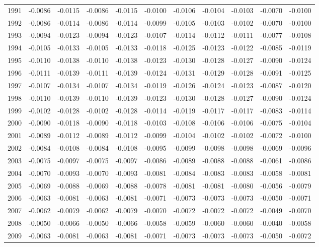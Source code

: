 \begin{tabular}{ccccccccccc}
  1991 & -0.0086 & -0.0115 & -0.0086 & -0.0115 & -0.0100 & -0.0106 & -0.0104 & -0.0103 & -0.0070 & -0.0100 \\ 
  1992 & -0.0086 & -0.0114 & -0.0086 & -0.0114 & -0.0099 & -0.0105 & -0.0103 & -0.0102 & -0.0070 & -0.0100 \\ 
  1993 & -0.0094 & -0.0123 & -0.0094 & -0.0123 & -0.0107 & -0.0114 & -0.0112 & -0.0111 & -0.0077 & -0.0108 \\ 
  1994 & -0.0105 & -0.0133 & -0.0105 & -0.0133 & -0.0118 & -0.0125 & -0.0123 & -0.0122 & -0.0085 & -0.0119 \\ 
  1995 & -0.0110 & -0.0138 & -0.0110 & -0.0138 & -0.0123 & -0.0130 & -0.0128 & -0.0127 & -0.0090 & -0.0124 \\ 
  1996 & -0.0111 & -0.0139 & -0.0111 & -0.0139 & -0.0124 & -0.0131 & -0.0129 & -0.0128 & -0.0091 & -0.0125 \\ 
  1997 & -0.0107 & -0.0134 & -0.0107 & -0.0134 & -0.0119 & -0.0126 & -0.0124 & -0.0123 & -0.0087 & -0.0120 \\ 
  1998 & -0.0110 & -0.0139 & -0.0110 & -0.0139 & -0.0123 & -0.0130 & -0.0128 & -0.0127 & -0.0090 & -0.0124 \\ 
  1999 & -0.0102 & -0.0128 & -0.0102 & -0.0128 & -0.0114 & -0.0119 & -0.0117 & -0.0117 & -0.0083 & -0.0114 \\ 
  2000 & -0.0090 & -0.0118 & -0.0090 & -0.0118 & -0.0103 & -0.0108 & -0.0106 & -0.0106 & -0.0075 & -0.0104 \\ 
  2001 & -0.0089 & -0.0112 & -0.0089 & -0.0112 & -0.0099 & -0.0104 & -0.0102 & -0.0102 & -0.0072 & -0.0100 \\ 
  2002 & -0.0084 & -0.0108 & -0.0084 & -0.0108 & -0.0095 & -0.0099 & -0.0098 & -0.0098 & -0.0069 & -0.0096 \\ 
  2003 & -0.0075 & -0.0097 & -0.0075 & -0.0097 & -0.0086 & -0.0089 & -0.0088 & -0.0088 & -0.0061 & -0.0086 \\ 
  2004 & -0.0070 & -0.0093 & -0.0070 & -0.0093 & -0.0081 & -0.0084 & -0.0083 & -0.0083 & -0.0058 & -0.0081 \\ 
  2005 & -0.0069 & -0.0088 & -0.0069 & -0.0088 & -0.0078 & -0.0081 & -0.0081 & -0.0080 & -0.0056 & -0.0079 \\ 
  2006 & -0.0063 & -0.0081 & -0.0063 & -0.0081 & -0.0071 & -0.0073 & -0.0073 & -0.0073 & -0.0050 & -0.0071 \\ 
  2007 & -0.0062 & -0.0079 & -0.0062 & -0.0079 & -0.0070 & -0.0072 & -0.0072 & -0.0072 & -0.0049 & -0.0070 \\ 
  2008 & -0.0050 & -0.0066 & -0.0050 & -0.0066 & -0.0058 & -0.0059 & -0.0060 & -0.0060 & -0.0040 & -0.0058 \\ 
  2009 & -0.0063 & -0.0081 & -0.0063 & -0.0081 & -0.0071 & -0.0073 & -0.0073 & -0.0073 & -0.0050 & -0.0072 \\ 
   \hline
\end{tabular}
